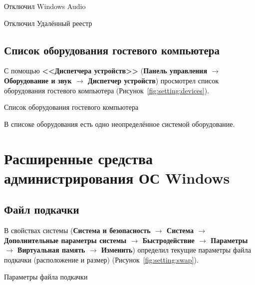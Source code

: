 \begin{image}
	\caption{Отключил Windows Audio}
	\label{fig:setting:services:windowsaudio}
\end{image}

\begin{image}
	\caption{Отключил Удалённый реестр}
	\label{fig:setting:services:registry}
\end{image}

\clearpage

\subsection{Список оборудования гостевого компьютера}

С помощью \textbf{<<Диспетчера устройств>>}
(\textbf{Панель управления $\rightarrow$ Оборудование и звук
$\rightarrow$ Диспетчер устройств}) просмотрел список оборудования
гостевого компьютера (Рисунок~\ref{fig:setting:devices}).

\begin{image}
	\caption{Список оборудования гостевого компьютера}
	\label{fig:setting:devices}
\end{image}

В списоке оборудования есть одно неопределённое системой оборудование.

\clearpage

\section{Расширенные средства администрирования ОС Windows}

\subsection{Файл подкачки}

В свойствах системы
(\textbf{Система и безопасность $\rightarrow$ Система
$\rightarrow$ Дополнительные параметры системы $\rightarrow$ Быстродействие
$\rightarrow$ Параметры $\rightarrow$ Виртуальная память
$\rightarrow$ Изменить})
определил текущие параметры файла подкачки (расположение и размер)
(Рисунок~\ref{fig:setting:swap}).

\begin{image}
	\caption{Параметры файла подкачки}
	\label{fig:setting:swap}
\end{image}

